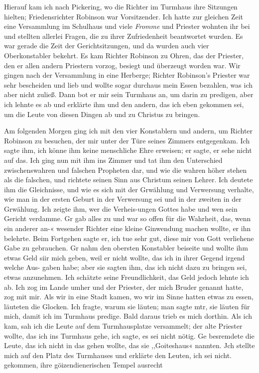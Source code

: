 Hierauf kam ich nach Pickering, wo die Richter im 
Turmhaus ihre Sitzungen hielten; Friedensrichter 
Robinson war 
Vorsitzender. Ich hatte zur gleichen Zeit eine Versammlung im
Schulhaus und viele \textit{Fromme} und Priester wohnten ihr bei
und stellten allerlei Fragen, die zu ihrer Zufriedenheit beantwortet
wurden. Es war gerade die Zeit der Gerichtsitzungen, und da
wurden auch vier Oberkonstabler bekehrt. Es kam Richter 
Robinson zu Ohren, das der Priester, den er allen andern Priestern
vorzog, besiegt und überzeugt worden war. Wir gingen nach
der Versammlung in eine Herberge; Richter Robinson’s Priester
war sehr bescheiden und lieb und wollte sogar durchaus mein
Essen bezahlen, was ich aber nicht zuließ. Dann bot er mir sein
Turmhaus an, um darin zu predigen, aber ich lehnte es ab und
erklärte ihm und den andern, das ich eben gekommen sei, um die
Leute von diesen Dingen ab und zu Christus zu bringen.

Am folgenden Morgen ging ich mit den vier Konstablern und
andern, um Richter Robinson zu besuchen, der mir unter der
Türe seines Zimmers entgegenkam. Ich sagte ihm, ich könne ihm
keine menschliche Ehre erweisen; 
er sagte, er sehe nicht auf das.
Ich ging nun mit ihm ins Zimmer und tat ihm den Unterschied
zwischenswahren und falschen Propheten dar, und wie die wahren
höher stehen als die falschen, und richtete seinen Sinn aus
Christum seinen Lehrer. Ich deutete ihm die Gleichnisse, und
wie es sich mit der Grwählung und Verwersung verhalte, wie
man in der ersten Geburt in der Verwersung sei und in der
zweiten in der Grwählung. Ich zeigte ihm, wer die Verheis-ungen
Gottes habe und wen sein Gericht verdamme. Gr gab alles zu
und war so offen für die Wahrheit, das, wenn ein anderer an-«
wesender Richter eine kleine Ginwendung machen wollte, er ihn
belehrte. Beim Fortgehen sagte er, ich tue sehr gut, diese mir
von Gott verliehene Gabe zu gebrauchen. Gr nahm den obersten
Konstabler beiseite und wollte ihm etwas Geld siir mich geben,
weil er nicht wollte, das ich in ihrer Gegend irgend welche Aus-
gaben habe; aber sie sagten ihm, das ich nicht dazu zu bringen
sei, etwas anzunehmen. Ich schätzte seine Freundlichkeit, das
Geld jedoch lehnte ich ab.
Ich zog im Lande umher und der Priester, der mich Bruder
genannt hatte, zog mit mir. Als wir in eine Stadt kamen, wo
wir im Sinne hatten etwas zu essen, läuteten die Glocken.
Ich fragte, warum sie läuten; man sagte mtr, sie läuten für mich,
damit ich im Turmhaus predige. Bald daraus trieb es mich
dorthin. Als ich kam, sah ich die Leute auf dem Turmhausplatze
versammelt; der alte Priester wollte, das ich ins Turmhaus gehe,
  ich sagte, es sei nicht nötig. Ge besremdete die Leute, das
ich nicht in das gehen wollte, das sie ,,Goiteshaus« nannten. Jch
stellte mich auf den Platz des Turmhauses und erklärte den Leuten,
ich sei nicht. gekommen, ihre göizendienerischen Tempel ausrecht
 


